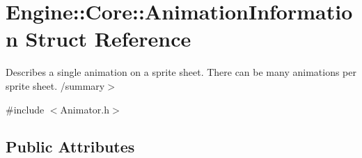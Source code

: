 \hypertarget{struct_engine_1_1_core_1_1_animation_information}{}\section{Engine\+:\+:Core\+:\+:Animation\+Information Struct Reference}
\label{struct_engine_1_1_core_1_1_animation_information}


Describes a single animation on a sprite sheet. There can be many animations per sprite sheet. /summary$>$  




{\ttfamily \#include $<$Animator.\+h$>$}

\subsection*{Public Attributes}
